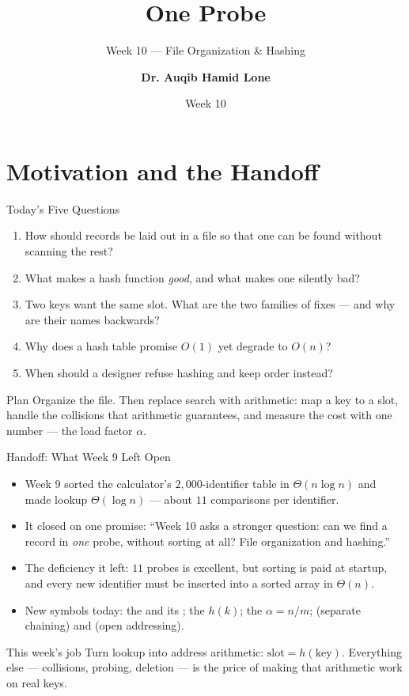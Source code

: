 \documentclass[aspectratio=169]{beamer}
\title{One Probe}
\subtitle{Week 10 --- File Organization \& Hashing}
\author[Dr. Auqib Hamid Lone]{\textbf{Dr. Auqib Hamid Lone}}
\institute[GCET Ganderbal]{PCC CS-301: Data Structures\\GCET, Ganderbal}
\date[Week 10]{\small Week 10}
\begin{document}
\frame{\titlepage}

\section{Motivation and the Handoff}

\begin{frame}{Today's Five Questions}
  \begin{enumerate}
    \item How should records be laid out in a file so that one can be found
      without scanning the rest?
    \item What makes a hash function \emph{good}, and what makes one silently
      bad?
    \item Two keys want the same slot. What are the two families of fixes ---
      and why are their names backwards?
    \item Why does a hash table promise $O(1)$ yet degrade to $O(n)$?
    \item When should a designer refuse hashing and keep order instead?
  \end{enumerate}
  \vspace{0.2cm}
  \begin{exampleblock}{Plan}
    Organize the file. Then replace search with arithmetic: map a key to a
    slot, handle the collisions that arithmetic guarantees, and measure the
    cost with one number --- the load factor $\alpha$.
  \end{exampleblock}
\end{frame}

\begin{frame}{Handoff: What Week 9 Left Open}
  \begin{itemize}
    \item Week 9 sorted the calculator's $2{,}000$-identifier table in
      $\Theta(n\log n)$ and made lookup $\Theta(\log n)$ --- about $11$
      comparisons per identifier.
    \item It closed on one promise: ``Week 10 asks a stronger question: can we
      find a record in \emph{one} probe, without sorting at all? File
      organization and hashing.''
    \item The deficiency it left: $11$ probes is excellent, but sorting is
      paid at startup, and every new identifier must be inserted into a
      sorted array in $\Theta(n)$.
    \item New symbols today: the  and its ; the
       $h(k)$; the  $\alpha = n/m$;
       (separate chaining) and  (open
      addressing).
  \end{itemize}
  \begin{exampleblock}{This week's job}
    Turn lookup into address arithmetic: $\text{slot} = h(\text{key})$.
    Everything else --- collisions, probing, deletion --- is the price of
    making that arithmetic work on real keys.
  \end{exampleblock}
\end{frame}
\end{document}
